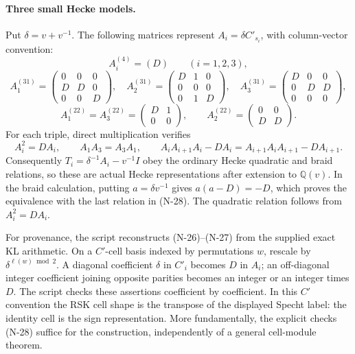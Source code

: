 \paragraph{Three small Hecke models.}
Put $\delta=v+v^{-1}$.  The following matrices represent
$A_i=\delta C'_{s_i}$, with column-vector convention:
\[
 A_i^{(4)}=(D)\qquad(i=1,2,3),
\]
\[
 A_1^{(31)}=\begin{pmatrix}0&0&0\\D&D&0\\0&0&D\end{pmatrix},\quad
 A_2^{(31)}=\begin{pmatrix}D&1&0\\0&0&0\\0&1&D\end{pmatrix},\quad
 A_3^{(31)}=\begin{pmatrix}D&0&0\\0&D&D\\0&0&0\end{pmatrix},
 \tag{N-26}
\]
\[
 A_1^{(22)}=A_3^{(22)}=
 \begin{pmatrix}D&1\\0&0\end{pmatrix},\qquad
 A_2^{(22)}=\begin{pmatrix}0&0\\D&D\end{pmatrix}.
 \tag{N-27}
\]
For each triple, direct multiplication verifies
\[
 A_i^2=DA_i,\qquad A_1A_3=A_3A_1,\qquad
 A_iA_{i+1}A_i-DA_i=A_{i+1}A_iA_{i+1}-DA_{i+1}.
 \tag{N-28}
\]
Consequently $T_i=\delta^{-1}A_i-v^{-1}I$ obey the ordinary
Hecke quadratic and braid relations, so these are actual Hecke
representations after extension to $\mathbb Q(v)$.  In the braid
calculation, putting $a=\delta v^{-1}$ gives
$a(a-D)=-D$, which proves the equivalence with the last relation
in (N-28).  The quadratic relation follows from $A_i^2=DA_i$.

For provenance, the script reconstructs (N-26)--(N-27) from the supplied
exact KL arithmetic.  On a $C'$-cell basis indexed by permutations $w$,
rescale by $\delta^{\ell(w)\bmod2}$.  A diagonal coefficient $\delta$
in $C'_i$ becomes $D$ in $A_i$; an off-diagonal integer coefficient
joining opposite parities becomes an integer or an integer times $D$.
The script checks these assertions coefficient by coefficient.  In this
$C'$ convention the RSK cell shape is the transpose of the displayed
Specht label: the identity cell is the sign representation.  More
fundamentally, the explicit checks (N-28) suffice for the construction,
independently of a general cell-module theorem.

